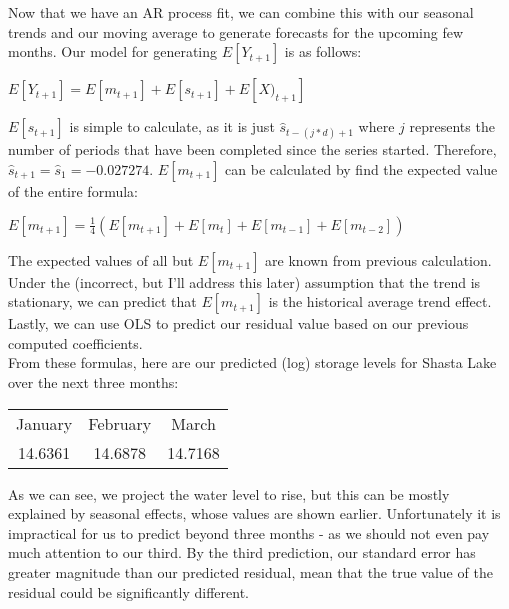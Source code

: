 \documentclass[twoside,12pt]{article}
\begin{document}
Now that we have an AR process fit, we can combine this with our seasonal trends and our moving average to generate forecasts for the upcoming few months. Our model for generating $E[Y_{t+1}]$ is as follows:\begin{center}
$E[Y_{t+1}] = E[m_{t+1}] + E[s_{t+1}] + E[X)_{t+1}]$ \end{center}
$E[s_{t+1}]$ is simple to calculate, as it is just $\hat s_{t-(j*d)+1}$ where $j$ represents the number of periods that have been completed since the series started. Therefore, $\hat s_{t+1} = \hat s_{1} = -0.027274$. 
$E[m_{t+1}]$ can be calculated by find the expected value of the entire formula:\begin{center} $E[m_{t+1}] = \frac{1}{4}(E[m_{t+1}] + E[m_{t}] + E[m_{t-1}] + E[m_{t-2}])$\end{center}
The expected values of all but $E[m_{t+1}]$ are known from previous calculation. Under the (incorrect, but I'll address this later) assumption that the trend is stationary, we can predict that $E[m_{t+1}]$ is the historical average trend effect. Lastly, we can use OLS to predict our residual value based on our previous computed coefficients. \\
From these formulas, here are our predicted (log) storage levels for Shasta Lake over the next three months:
\begin{table}[ht]
\centering
\begin{tabular}{ccc}
  \hline
  January & February & March \\
  14.6361 & 14.6878 & 14.7168 \\
  \hline
\end{tabular}
\end{table}
As we can see, we project the water level to rise, but this can be mostly explained by seasonal effects, whose values are shown earlier. Unfortunately it is impractical for us to predict beyond three months - as we should not even pay much attention to our third. By the third prediction, our standard error has greater magnitude than our predicted residual, mean that the true value of the residual could be significantly different.
\end{document}
